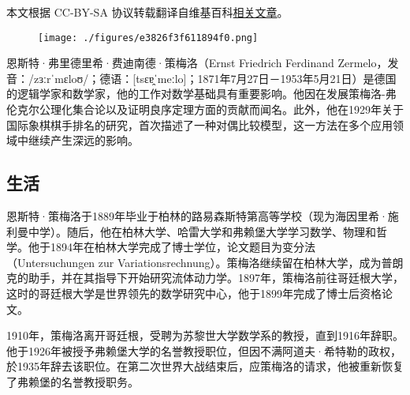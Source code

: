 
本文根据 CC-BY-SA 协议转载翻译自维基百科\href{https://en.wikipedia.org/wiki/Ernst_Zermelo}{相关文章}。

\begin{figure}[ht]
\centering
\texttt{[image: ./figures/e3826f3f611894f0.png]}
\caption{} \label{fig_Zerme_1}
\end{figure}
恩斯特·弗里德里希·费迪南德·策梅洛（Ernst Friedrich Ferdinand Zermelo，发音：/zɜːrˈmɛloʊ/；德语：[tsɛɐ̯ˈmeːlo]；1871年7月27日－1953年5月21日）是德国的逻辑学家和数学家，他的工作对数学基础具有重要影响。他因在发展策梅洛-弗伦克尔公理化集合论以及证明良序定理方面的贡献而闻名。此外，他在1929年关于国际象棋棋手排名的研究，首次描述了一种对偶比较模型，这一方法在多个应用领域中继续产生深远的影响。
\subsection{生活}
恩斯特·策梅洛于1889年毕业于柏林的路易森斯特第高等学校（现为海因里希·施利曼中学）。随后，他在柏林大学、哈雷大学和弗赖堡大学学习数学、物理和哲学。他于1894年在柏林大学完成了博士学位，论文题目为变分法（Untersuchungen zur Variationsrechnung）。策梅洛继续留在柏林大学，成为普朗克的助手，并在其指导下开始研究流体动力学。1897年，策梅洛前往哥廷根大学，这时的哥廷根大学是世界领先的数学研究中心，他于1899年完成了博士后资格论文。

1910年，策梅洛离开哥廷根，受聘为苏黎世大学数学系的教授，直到1916年辞职。他于1926年被授予弗赖堡大学的名誉教授职位，但因不满阿道夫·希特勒的政权，於1935年辞去该职位。在第二次世界大战结束后，应策梅洛的请求，他被重新恢复了弗赖堡的名誉教授职务。


